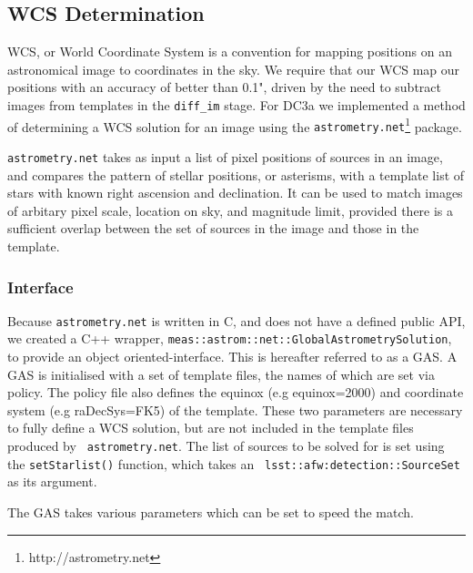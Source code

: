 
\subsection{WCS Determination} \label{sec:wcs}

WCS, or World Coordinate System is a convention for mapping positions
on an astronomical image to coordinates in the sky. We require that
our WCS map our positions with an accuracy of better than 0.1", driven
by the need to subtract images from templates in the {\tt diff\_im}
stage. For DC3a we implemented a method of determining a WCS solution
for an image using the {\tt astrometry.net}\footnote{http://astrometry.net} package.

{\tt astrometry.net} takes as input a list of pixel
positions of sources in an image, and compares the pattern of stellar
positions, or asterisms, with a template list of stars with known
right ascension and declination. It can be used to match images of
arbitary pixel scale, location on sky, and magnitude limit, provided
there is a sufficient overlap between the set of sources in the image
and those in the template.

\subsubsection{Interface}
Because {\tt astrometry.net} is written in C, and does not have a
defined public API, we created a C++ wrapper,
{\tt meas::astrom::net::GlobalAstrometrySolution}, 
to provide an object oriented-interface. This is hereafter referred to as
a GAS. A GAS is initialised with a set of template files, the names of
which are set via policy. The policy file also defines the equinox
(e.g equinox=2000) and coordinate system (e.g raDecSys=FK5) of the
template. These two parameters are necessary to fully define a WCS
solution, but are not included in the template files produced by {\tt
  astrometry.net}. The list of sources to be solved for is set using
the {\tt setStarlist()} function, which takes an {\tt
  lsst::afw:detection::SourceSet} as its argument.


The GAS takes various parameters which can be set to speed the match. 

